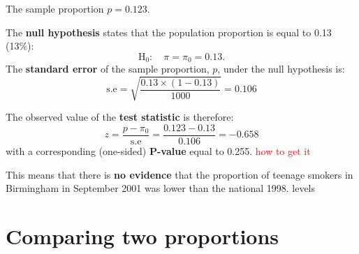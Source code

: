 \documentclass[compress, notes=hide]{beamer}
\newcommand{\hl}[1]{\textbf{#1}}
\begin{document}
\begin{frame}
\begin{block}{}
	The sample proportion $p = 0.123$. 
	\vspace{0.2cm}
	
  The \hl{null hypothesis} states that the population proportion is
  equal to 0.13 (13\%):
\begin{equation*}
\mathrm{H}_0: \quad \pi = \pi_0 = 0.13.
\end{equation*}
The \hl{standard error} of the sample proportion, $p$, under the
null hypothesis is:
\begin{equation*}
\text{s.e} = \sqrt{ \frac{0.13 \times (1 - 0.13)}{1000} } = 0.106
\end{equation*}
\end{block}
\end{frame}

\begin{frame}
\begin{block}{}
The observed value of the \hl{test statistic} is therefore:
\begin{equation*}
z = \frac{p - \pi_0}{\text{s.e}} =  \frac{0.123 - 0.13}{0.106} = -0.658
\end{equation*}
with a corresponding (one-sided) \hl{$\bm{P}$-value} equal to 0.255. \textcolor{red}{how to get it}


This means that there is \textbf{no evidence} that the proportion of teenage smokers
in Birmingham in September 2001 was lower than the national 1998.
levels
\end{block}
\end{frame}






\section{Comparing two proportions}
\end{document}
